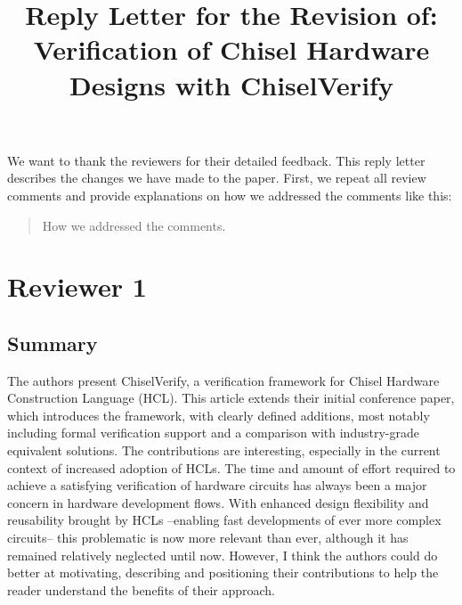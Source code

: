 \documentclass{article}
\newcommand{\reply}[1]{{\color{blue} #1}}
\begin{document}

\title{Reply Letter for the Revision of:\\[2ex]Verification of Chisel Hardware Designs with ChiselVerify}


\maketitle \thispagestyle{empty}


We want to thank the reviewers for their detailed feedback.
This reply letter describes the changes we have made to the paper.
First, we repeat all review comments and provide explanations on how we addressed the comments like this:

\begin{quote}
\reply{How we addressed the comments.}
\end{quote}



\section*{Reviewer 1}



\subsection*{Summary}
The authors present ChiselVerify, a verification framework for Chisel Hardware Construction Language (HCL).
This article extends their initial conference paper, which introduces the framework, with clearly defined additions, most notably including formal verification support and a comparison with industry-grade equivalent solutions.
The contributions are interesting, especially in the current context of increased adoption of HCLs.
The time and amount of effort required to achieve a satisfying verification of hardware circuits has always been a major concern in hardware development flows.
With enhanced design flexibility and reusability brought by HCLs --enabling fast developments of ever more complex circuits-- this problematic is now more relevant than ever, although it has remained relatively neglected until now.
However, I think the authors could do better at motivating, describing and positioning their contributions to help the reader understand the benefits of their approach.
\end{document}
